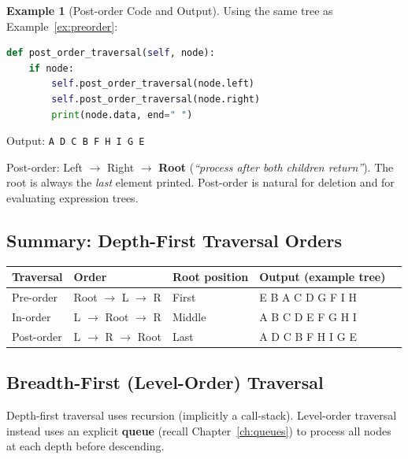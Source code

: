 \documentclass[11pt, a4paper, notitlepage]{report}
\theoremstyle{definition}
\theoremstyle{remark}
\theoremstyle{definition}
\newtheorem{example}[theorem]{Example}
\begin{document}
\begin{example}[Post-order Code and Output]
\label{ex:postorder}
Using the same tree as Example~\ref{ex:preorder}:

\begin{lstlisting}[language=Python]
def post_order_traversal(self, node):
    if node:
        self.post_order_traversal(node.left)
        self.post_order_traversal(node.right)
        print(node.data, end=" ")
\end{lstlisting}

Output: \texttt{A D C B F H I G E}
\end{example}

\begin{keyresult}[title={Key Result: Post-order Mnemonic}]
Post-order: Left $\to$ Right $\to$ \textbf{Root} \quad (\emph{``process after
both children return''}).  The root is always the \emph{last} element printed.
Post-order is natural for deletion and for evaluating expression trees.
\end{keyresult}

\subsection{Summary: Depth-First Traversal Orders}
\label{subsec:dfs-summary}

\begin{center}
\begin{tabular}{@{}lllll@{}}
\toprule
\textbf{Traversal} & \textbf{Order} & \textbf{Root position} & \textbf{Output (example tree)} \\
\midrule
Pre-order  & Root $\to$ L $\to$ R & First  & E B A C D G F I H \\
In-order   & L $\to$ Root $\to$ R & Middle & A B C D E F G H I \\
Post-order & L $\to$ R $\to$ Root & Last   & A D C B F H I G E \\
\bottomrule
\end{tabular}
\end{center}

\subsection{Breadth-First (Level-Order) Traversal}
\label{subsec:levelorder}

Depth-first traversal uses recursion (implicitly a call-stack).
Level-order traversal instead uses an explicit \textbf{queue} (recall
Chapter~\ref{ch:queues}) to process all nodes at each depth before descending.
\end{document}
